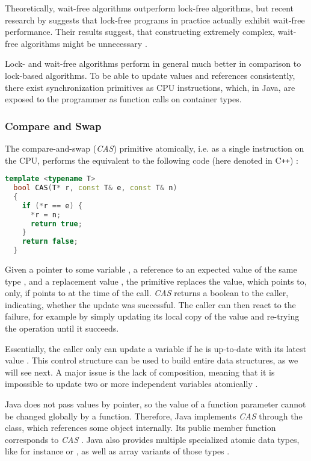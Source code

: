 Theoretically, wait-free algorithms outperform lock-free algorithms, but recent
research by \citet{Alistarh2013Are} suggests that lock-free programs in practice
actually exhibit wait-free performance. Their results suggest, that constructing
extremely complex, wait-free algorithms might be unnecessary
\cite{Alistarh2013Are}.

Lock- and wait-free algorithms perform in general much better in comparison to
lock-based algorithms. To be able to update values and references consistently,
there exist synchronization primitives as CPU instructions, which, in Java, are
exposed to the programmer as function calls on container types.

\subsubsection{Compare and Swap}
\label{sec:introduction-cas}

The compare-and-swap (\emph{CAS}) primitive atomically, i.e. as a single
instruction on the CPU, performs the equivalent to the following code (here
denoted in C{}\verb!++!) \cite{Goetz2006Java, Herlihy2008Art}:

\begin{lstlisting}[frame=L, language=C++]
  template <typename T>
  bool CAS(T* r, const T& e, const T& n)
  {
    if (*r == e) {
      *r = n;
      return true;
    }
    return false;
  }
\end{lstlisting}

Given a pointer to some variable , a reference to an expected
value of the same type , and a replacement value ,
the primitive replaces the value, which  points to, only, if
 points to  at the time of the call. \emph{CAS}
returns a boolean to the caller, indicating, whether the update was
successful. The caller can then react to the failure, for example by simply
updating its local copy of the value and re-trying the operation until it
succeeds.

Essentially, the caller only can update a variable if he is up-to-date with its
latest value \cite{Goetz2006Java}. This control structure can be used to build
entire data structures, as we will see next. A major issue is the lack of
composition, meaning that it is impossible to update two or more independent
variables atomically \cite{Herlihy2008Art}.

Java does not pass values by pointer, so the value of a function parameter
cannot be changed globally by a function. Therefore, Java implements \emph{CAS}
through the  class, which references some object
internally. Its public member function  corresponds to
\emph{CAS} \cite{Goetz2006Java}. Java also provides multiple specialized atomic
data types, like for instance  or
, as well as array variants of those types
\cite{Goetz2006Java}.

